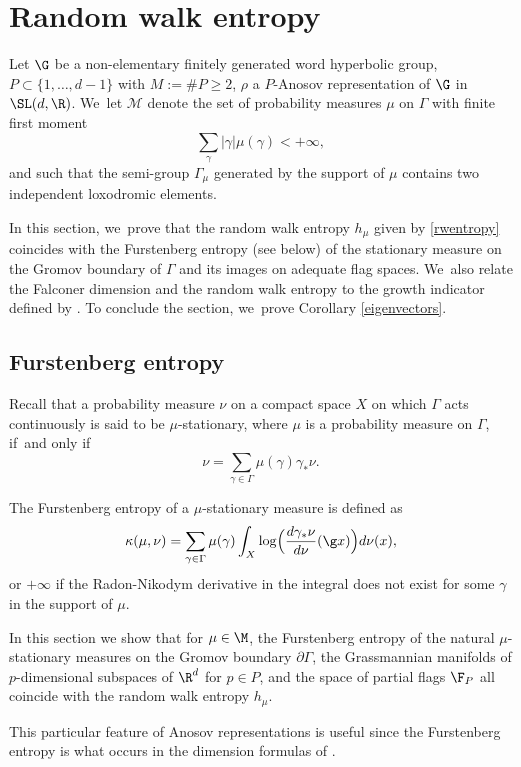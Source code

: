 \section{Random walk entropy}

Let \(\G\) be a non-elementary finitely generated word hyperbolic group, \(P \subset \lbrace 1,\ldots, d-1 \rbrace\) with \(M:= \#P \ge 2 \), \(\rho \) a \(P\)-Anosov representation of \(\G\) in \(\SL (d,\R) \). We~let \(\mathcal{M}\) denote the set of probability measures \(\mu\) on \(\Gamma\) with finite first moment
\[
\sum_{\gamma} |\gamma| \mu(\gamma) < +\infty,
\]
and such that the semi-group \(\Gamma_\mu\) generated by the support of \(\mu\) contains two independent loxodromic elements.

In this section, we~prove that the random walk entropy \(h_\mu \) given by \eqref{rwentropy} coincides with the Furstenberg entropy (see below) of the stationary measure on the Gromov boundary of \(\Gamma\) and its images on adequate flag spaces. We~also relate the Falconer dimension and the random walk entropy to the growth indicator defined by \cite{Qui02a}. To conclude the section, we~prove Corollary \ref{eigenvectors}.

\subsection{Furstenberg entropy}

Recall that a probability measure \(\nu\) on a compact space \(X\) on which \(\Gamma\) acts continuously is said to be \(\mu\)-stationary, where \(\mu\) is a probability measure on \(\Gamma\), if~and only if
\[
\nu = \sum_{\gamma \in \Gamma}\mu(\gamma)\gamma_*\nu.
\]

The Furstenberg entropy of a \(\mu\)-stationary measure is defined as
\[
\kappa(\mu,\nu) = \sum_{\gamma \in \Gamma} \mu(\gamma) \int_{X} \log\Bigl(\frac{d\gamma_*\nu}{d\nu}(\g x)\Bigr)d\nu(x),
\]
or \(+\infty\) if the Radon-Nikodym derivative in the integral does not exist for some \(\gamma\) in the support of \(\mu\).

In this section we show that for \(\mu \in \M\), the Furstenberg entropy of the natural \(\mu\)-stationary measures on the Gromov boundary \(\partial\Gamma\), the Grassmannian manifolds of \(p\)-dimensional subspaces of \(\R^d\) for \(p \in P\), and the space of partial flags \(\F_P\) all coincide with the random walk entropy \(h_\mu\).

This particular feature of Anosov representations is useful since the Furstenberg entropy is what occurs in the dimension formulas of \cite{LL23}.

